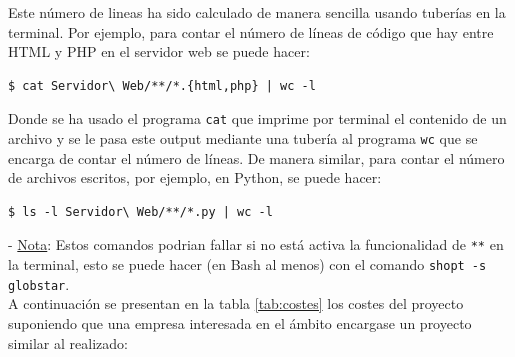 \documentclass[11pt]{article}
\begin{document}
Este número de lineas ha sido calculado de manera sencilla usando tuberías en la
terminal. Por ejemplo, para contar el número de líneas de código que hay entre
HTML y PHP en el servidor web se puede hacer:

\begin{verbatim}
$ cat Servidor\ Web/**/*.{html,php} | wc -l
\end{verbatim}

Donde se ha usado el programa \verb|cat| que imprime por terminal el contenido
de un archivo y se le pasa este output mediante una tubería al programa
\verb|wc| que se encarga de contar el número de líneas. De manera similar,
para contar el número de archivos escritos, por ejemplo, en Python, se puede hacer:

\begin{verbatim}
$ ls -l Servidor\ Web/**/*.py | wc -l
\end{verbatim}

- \underline{Nota}: Estos comandos podrian fallar si no está activa la
funcionalidad de \verb|**| en la terminal, esto se puede hacer (en Bash al
menos) con el comando \verb|shopt -s globstar|. \\

A continuación se presentan en la tabla \ref{tab:costes} los costes del proyecto
suponiendo que una empresa interesada en el ámbito encargase un proyecto similar
al realizado:
\end{document}
